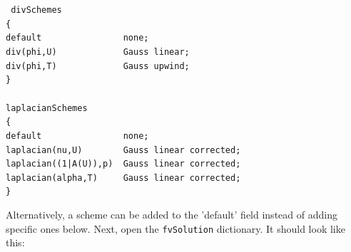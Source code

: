 \documentclass{article}
\newcommand\tab[1][0.5cm]{\hspace*{#1}}
\begin{document}
\begin{enumerate}[2.1]
	\begin{myframe}
	{\tt %
	divSchemes\\
	\{\\
	\tab default~~~~~~~~~~~~~~~~none;\\
	\tab div(phi,U)~~~~~~~~~~~~~Gauss linear; \\
	\tab div(phi,T)~~~~~~~~~~~~~Gauss upwind; \\
	\}\\
	\\
	laplacianSchemes\\
	\{\\
	\tab default~~~~~~~~~~~~~~~~none;\\
	\tab laplacian(nu,U)~~~~~~~~Gauss linear corrected;\\
	\tab laplacian((1|A(U)),p)~~Gauss linear corrected;\\
	\tab laplacian(alpha,T)~~~~~Gauss linear corrected;\\
	\}\\
		
	}
	\end{myframe}

	Alternatively, a scheme can be added to the 'default' field instead of adding specific ones below. Next, open the {\tt fvSolution} dictionary. It should look like this: 
	

\end{enumerate}
\end{document}
